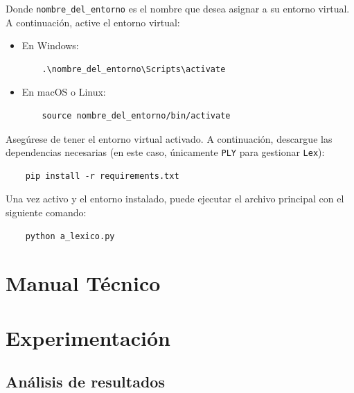 \documentclass{article}
\begin{document}
Donde \texttt{nombre\_del\_entorno} es el nombre que desea asignar a su entorno virtual.
A continuación, active el entorno virtual:

\begin{itemize}
  \item En Windows:
        \begin{verbatim}
    .\nombre_del_entorno\Scripts\activate
  \end{verbatim}
  \item En macOS o Linux:
        \begin{verbatim}
    source nombre_del_entorno/bin/activate
  \end{verbatim}
\end{itemize}

Asegúrese de tener el entorno virtual activado. 
A continuación, descargue las dependencias necesarias 
(en este caso, únicamente \texttt{PLY} para gestionar \texttt{Lex}):

\begin{verbatim}
    pip install -r requirements.txt
\end{verbatim}

Una vez activo y el entorno instalado, puede ejecutar el archivo 
principal con el siguiente comando:

\begin{center}
  \begin{adjustbox}{minipage=\linewidth, center}
  \begin{verbatim}
    python a_lexico.py
  \end{verbatim}
  \end{adjustbox}
\end{center}



\section{Manual Técnico}\label{sec:man_t}


\section{Experimentación}\label{sec:exp}

\subsection{Análisis de resultados}
\end{document}
